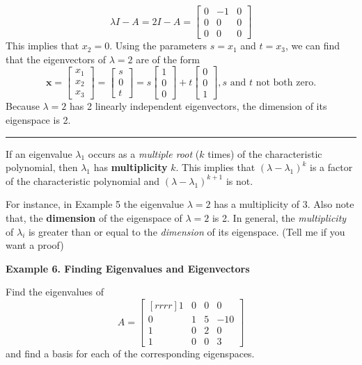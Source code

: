 \documentclass{article}
\begin{document}
    \[ \lambda I - A = 2I - A = \begin{bmatrix}
        0 & -1 & 0 \\
        0 & 0 & 0 \\
        0 & 0 & 0
    \end{bmatrix}\]
    This implies that $x_2 = 0$. Using the parameters $s = x_1$ and $t = x_3$, we can find that the eigenvectors of 
    $ \lambda = 2$ are of the form
    \[ \textbf{x} = \begin{bmatrix}
        x_1 \\ x_2 \\ x_3 
    \end{bmatrix} = \begin{bmatrix}
        s \\ 0 \\ t
    \end{bmatrix} = s \begin{bmatrix}
        1 \\ 0 \\ 0
    \end{bmatrix} + t \begin{bmatrix}
        0 \\ 0 \\ 1
    \end{bmatrix}, \text{$s$ and $t$ not both zero.} \]
    Because $ \lambda = 2$ has 2 linearly independent eigenvectors, the dimension of its eigenspace is 2.

    {\color{blue9} \rule{10cm}{0.3mm}}

    If an eigenvalue $ \lambda _1$ occurs as a \textit{multiple root} ($k$ times) of the characteristic polynomial, then $ \lambda _1$ has \textbf{multiplicity} $k$.
    This implies that $( \lambda  - \lambda _1 )^k$ is a factor of the characteristic polynomial and $( \lambda  - \lambda _1 )^{k+1}$ is not. 

    For instance,
    in Example 5 the eigenvalue $ \lambda  = 2$ has a multiplicity of $3$. Also note that, the \textbf{dimension} of the eigenspace of $ \lambda  = 2$ is 2.
    In general, the \textit{multiplicity} of $ \lambda_i$ is greater than or equal to the \textit{dimension} of its eigenspace. 
    \textcolor{blue5}{(Tell me if you want a proof)}

    \textbf{Example 6. \textcolor{blue5}{Finding Eigenvalues and Eigenvectors}}

    Find the eigenvalues of
    \[A = \begin{bmatrix}[rrrr]
        1 & 0 & 0 & 0 \\
        0 & 1 & 5 & -10 \\
        1 & 0 & 2 & 0\\
        1 & 0 & 0 & 3
    \end{bmatrix} \]
    and find a basis for each of the corresponding eigenspaces.
    
\end{document}
